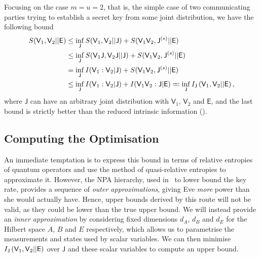 \documentclass[10pt, a4paper]{article}
\numberwithin{equation}{section} %
\theoremstyle{definition}
\theoremstyle{plain}
\newcommand{\?}{\mathrel{?}} %
\newcommand{\crv}[1]{\mathsf{#1}}
\begin{document}
                        Focusing on the case \(m = u = 2\), that is, the simple case of two communicating parties trying to establish a secret key from some joint distribution, we have the following bound~\cite[Cor. 2]{ClassicalUpperBounds}
                        \begin{align}
                          S(\crv{V}_1, \crv{V}_2||\crv{E}) &\leq \inf_\crv{J} S(\crv{V}_1, \crv{V}_2||\crv{J}) + S(\crv{V}_1\crv{V}_2, \crv{J}^{(s)}||\crv{E}) \\
                                                           &\leq \inf_\crv{J} S(\crv{V}_1\crv{J}, \crv{V}_2\crv{J}||\crv{J}) + S(\crv{V}_1\crv{V}_2, \crv{J}^{(s)}||\crv{E}) \\
                                                           &= \inf_\crv{J} I(\crv{V}_1 : \crv{V}_2|\crv{J}) + S(\crv{V}_1\crv{V}_2, \crv{J}^{(s)}||\crv{E}) \\
                                                           &\leq \inf_\crv{J} I(\crv{V}_1 : \crv{V}_2|\crv{J}) + I(\crv{V}_1\crv{V}_2 : \crv{J}|\crv{E}) \eqqcolon \inf_{\crv{J}} \splitkey{\crv{V}_1,\crv{V}_2}{\crv{E}},
                        \end{align}
                        where \(\crv{J}\) can have an arbitrary joint distribution with \(\crv{V}_1\), \(\crv{V}_2\) and \(\crv{E}\), and the last bound is strictly better than the reduced intrinsic information ().

                        \subsection{Computing the Optimisation}

                        An immediate temptation is to express this bound in terms of relative entropies of quantum operators and use the method of quasi-relative entropies to approximate it. However, the NPA hierarchy, used in~\cite{BFF_QRE} to lower bound the key rate, provides a sequence of \emph{outer approximations}, giving Eve \emph{more} power than she would actually have. Hence, upper bounds derived by this route will not be valid, as they could be lower than the true upper bound. We will instead provide an \emph{inner approximation} by considering fixed dimensions \(d_A\), \(d_B\) and \(d_E\) for the Hilbert space \(A\), \(B\) and \(E\) respectively, which allows us to parametrise the measurements and states used by scalar variables. We can then minimise \(\splitkey{\crv{V}_1,\crv{V}_2}{\crv{E}}\) over \(\crv{J}\) and these scalar variables to compute an upper bound.
\end{document}
